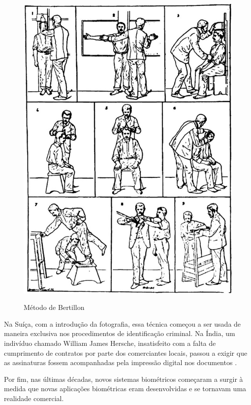 \begin{figure}[h!]
    \centering
    \caption{Método de Bertillon}
    \includegraphics[scale=0.25]{figuras/bertillon.jpg} 
    \label{fig:bertillon}
    \centering
\end{figure}

Na Suíça, com a introdução da fotografia, essa técnica começou a ser 
usada de maneira exclusiva nos procedimentos de identificação 
criminal. Na Índia, um indivíduo chamado William James Hersche, 
insatisfeito com a falta de cumprimento de contratos por parte 
dos comerciantes locais, passou a exigir que as assinaturas 
fossem acompanhadas pela impressão digital nos documentos \cite[p. 18]{boechat2008}.

Por fim, nas últimas décadas, novos sistemas biométricos começaram a surgir 
à medida que novas aplicações biométricas eram desenvolvidas e se tornavam 
uma realidade comercial.

